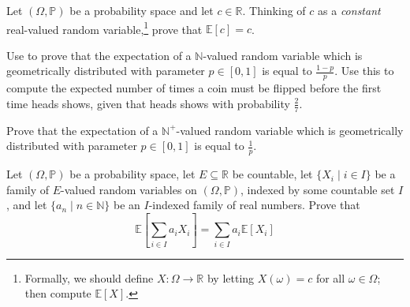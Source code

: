 \begin{exercise}
Let $(\Omega,\mathbb{P})$ be a probability space and let $c \in \mathbb{R}$. Thinking of $c$ as a \textit{constant} real-valued random variable,\footnote{Formally, we should define $X : \Omega \to \mathbb{R}$ by letting $X(\omega)=c$ for all $\omega \in \Omega$; then compute $\mathbb{E}[X]$.} prove that $\mathbb{E}[c]=c$.
\end{exercise}


\begin{exercise}
\label{exExpectationOfGeometric}
Use  to prove that the expectation of a $\mathbb{N}$-valued random variable which is geometrically distributed with parameter $p \in [0,1]$ is equal to $\frac{1-p}{p}$. Use this to compute the expected number of times a coin must be flipped before the first time heads shows, given that heads shows with probability $\frac{2}{7}$.
\end{exercise}

\begin{exercise}
\label{exExpectationOfGeometricPositive}
Prove that the expectation of a $\mathbb{N}^+$-valued random variable which is geometrically distributed with parameter $p \in [0,1]$ is equal to $\frac{1}{p}$.
\end{exercise}

\begin{exercise}
Let $(\Omega,\mathbb{P})$ be a probability space, let $E \subseteq \mathbb{R}$ be countable, let $\{ X_i \mid i \in I \}$ be a family of $E$-valued random variables on $(\Omega,\mathbb{P})$, indexed by some countable set $I$, and let $\{ a_n \mid n \in \mathbb{N} \}$ be an $I$-indexed family of real numbers. Prove that
\[ \mathbb{E} \left[ \sum_{i \in I} a_i X_i \right] = \sum_{i \in I} a_i\mathbb{E}[X_i] \]
\end{exercise}

